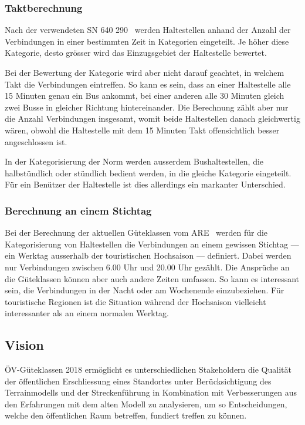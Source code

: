 \subsubsection{Taktberechnung}
\label{problem:Taktberechnung}

Nach der verwendeten \acs{SN} 640 290~\cite{sn640290} werden Haltestellen anhand der Anzahl der Verbindungen in einer bestimmten Zeit in Kategorien eingeteilt.
Je höher diese Kategorie, desto grösser wird das Einzugsgebiet der Haltestelle bewertet.

Bei der Bewertung der Kategorie wird aber nicht darauf geachtet, in welchem Takt die Verbindungen eintreffen.
So kann es sein, dass an einer Haltestelle alle 15 Minuten genau ein Bus ankommt, bei einer anderen alle 30 Minuten gleich zwei Busse in gleicher Richtung hintereinander.
Die Berechnung zählt aber nur die Anzahl Verbindungen insgesamt, womit beide Haltestellen danach gleichwertig wären, obwohl die Haltestelle mit dem 15 Minuten Takt offensichtlich besser angeschlossen ist.

In der Kategorisierung der Norm werden ausserdem Bushaltestellen, die halbstündlich oder stündlich bedient werden, in die gleiche Kategorie eingeteilt.
Für ein Benützer der Haltestelle ist dies allerdings ein markanter Unterschied.

\subsubsection{Berechnung an einem Stichtag}
\label{problem:Berechnung an einem Stichtag}

Bei der Berechnung der aktuellen Güteklassen vom \ac{ARE}~\cite{berechnung_are} werden für die Kategorisierung von Haltestellen die Verbindungen an einem gewissen Stichtag --- ein Werktag ausserhalb der touristischen Hochsaison --- definiert.
Dabei werden nur Verbindungen zwischen 6.00 Uhr und 20.00 Uhr gezählt.
Die Ansprüche an die Güteklassen können aber auch andere Zeiten umfassen.
So kann es interessant sein, die Verbindungen in der Nacht oder am Wochenende einzubeziehen.
Für touristische Regionen ist die Situation während der Hochsaison vielleicht interessanter als an einem normalen Werktag.

\subsection{Vision}
\label{Einführung:Vision}

\acs{ÖV}-Güteklassen 2018 ermöglicht es unterschiedlichen Stakeholdern die Qualität der öffentlichen Erschliessung eines Standortes unter Berücksichtigung des \gls{Terrainmodell}s und der Streckenführung in Kombination mit Verbesserungen aus den Erfahrungen mit dem alten Modell zu analysieren, um so Entscheidungen, welche den öffentlichen Raum betreffen, fundiert treffen zu können.

